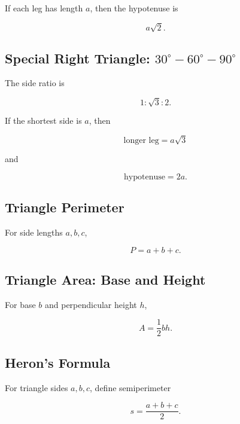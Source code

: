 If each leg has length \(a\), then the hypotenuse is

\[
\boxed{
a\sqrt2.
}
\]

\subsection{Special Right Triangle: \(30^\circ-60^\circ-90^\circ\)}
\label{subsec:30-60-90-reference}

The side ratio is

\[
\boxed{
1:\sqrt3:2.
}
\]

If the shortest side is \(a\), then

\[
\boxed{
\text{longer leg}
=
a\sqrt3
}
\]

and

\[
\boxed{
\text{hypotenuse}
=
2a.
}
\]

\subsection{Triangle Perimeter}
\label{subsec:triangle-perimeter-reference}

For side lengths \(a,b,c\),

\[
\boxed{
P=a+b+c.
}
\]

\subsection{Triangle Area: Base and Height}
\label{subsec:triangle-area-base-height}

For base \(b\) and perpendicular height \(h\),

\[
\boxed{
A
=
\frac12bh.
}
\]

\subsection{Heron's Formula}
\label{subsec:herons-formula-reference}

For triangle sides \(a,b,c\), define semiperimeter

\[
\boxed{
s
=
\frac{a+b+c}{2}.
}
\]

